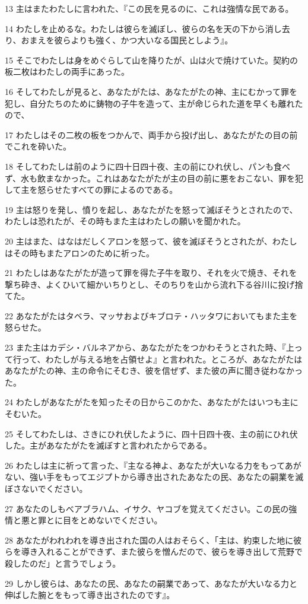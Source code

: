 \par 13 主はまたわたしに言われた、『この民を見るのに、これは強情な民である。
\par 14 わたしを止めるな。わたしは彼らを滅ぼし、彼らの名を天の下から消し去り、おまえを彼らよりも強く、かつ大いなる国民としよう』。
\par 15 そこでわたしは身をめぐらして山を降りたが、山は火で焼けていた。契約の板二枚はわたしの両手にあった。
\par 16 そしてわたしが見ると、あなたがたは、あなたがたの神、主にむかって罪を犯し、自分たちのために鋳物の子牛を造って、主が命じられた道を早くも離れたので、
\par 17 わたしはその二枚の板をつかんで、両手から投げ出し、あなたがたの目の前でこれを砕いた。
\par 18 そしてわたしは前のように四十日四十夜、主の前にひれ伏し、パンも食べず、水も飲まなかった。これはあなたがたが主の目の前に悪をおこない、罪を犯して主を怒らせたすべての罪によるのである。
\par 19 主は怒りを発し、憤りを起し、あなたがたを怒って滅ぼそうとされたので、わたしは恐れたが、その時もまた主はわたしの願いを聞かれた。
\par 20 主はまた、はなはだしくアロンを怒って、彼を滅ぼそうとされたが、わたしはその時もまたアロンのために祈った。
\par 21 わたしはあなたがたが造って罪を得た子牛を取り、それを火で焼き、それを撃ち砕き、よくひいて細かいちりとし、そのちりを山から流れ下る谷川に投げ捨てた。
\par 22 あなたがたはタベラ、マッサおよびキブロテ・ハッタワにおいてもまた主を怒らせた。
\par 23 また主はカデシ・バルネアから、あなたがたをつかわそうとされた時、『上って行って、わたしが与える地を占領せよ』と言われた。ところが、あなたがたはあなたがたの神、主の命令にそむき、彼を信ぜず、また彼の声に聞き従わなかった。
\par 24 わたしがあなたがたを知ったその日からこのかた、あなたがたはいつも主にそむいた。
\par 25 そしてわたしは、さきにひれ伏したように、四十日四十夜、主の前にひれ伏した。主があなたがたを滅ぼすと言われたからである。
\par 26 わたしは主に祈って言った、『主なる神よ、あなたが大いなる力をもってあがない、強い手をもってエジプトから導き出されたあなたの民、あなたの嗣業を滅ぼさないでください。
\par 27 あなたのしもべアブラハム、イサク、ヤコブを覚えてください。この民の強情と悪と罪とに目をとめないでください。
\par 28 あなたがわれわれを導き出された国の人はおそらく、「主は、約束した地に彼らを導き入れることができず、また彼らを憎んだので、彼らを導き出して荒野で殺したのだ」と言うでしょう。
\par 29 しかし彼らは、あなたの民、あなたの嗣業であって、あなたが大いなる力と伸ばした腕とをもって導き出されたのです』。

